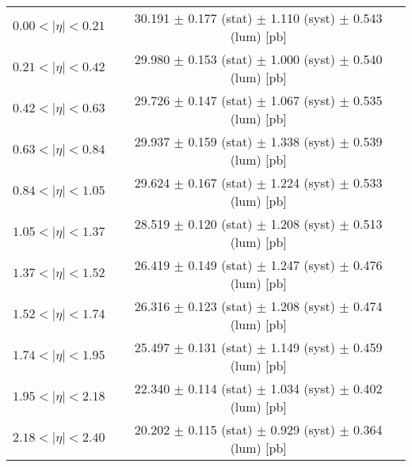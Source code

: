 \begin{tabular}{lc}
\hline
$0.00 < |\eta| <0.21$          & 30.191 $\pm$ 0.177 (stat) $\pm$ 1.110 (syst) $\pm$ 0.543 (lum) [pb]  \\
$0.21 < |\eta| <0.42$          & 29.980 $\pm$ 0.153 (stat) $\pm$ 1.000 (syst) $\pm$ 0.540 (lum) [pb]  \\
$0.42 < |\eta| <0.63$          & 29.726 $\pm$ 0.147 (stat) $\pm$ 1.067 (syst) $\pm$ 0.535 (lum) [pb]  \\
$0.63 < |\eta| <0.84$          & 29.937 $\pm$ 0.159 (stat) $\pm$ 1.338 (syst) $\pm$ 0.539 (lum) [pb]  \\
$0.84 < |\eta| <1.05$          & 29.624 $\pm$ 0.167 (stat) $\pm$ 1.224 (syst) $\pm$ 0.533 (lum) [pb]  \\
$1.05 < |\eta| <1.37$          & 28.519 $\pm$ 0.120 (stat) $\pm$ 1.208 (syst) $\pm$ 0.513 (lum) [pb]  \\
$1.37 < |\eta| <1.52$          & 26.419 $\pm$ 0.149 (stat) $\pm$ 1.247 (syst) $\pm$ 0.476 (lum) [pb]  \\
$1.52 < |\eta| <1.74$          & 26.316 $\pm$ 0.123 (stat) $\pm$ 1.208 (syst) $\pm$ 0.474 (lum) [pb]  \\
$1.74 < |\eta| <1.95$          & 25.497 $\pm$ 0.131 (stat) $\pm$ 1.149 (syst) $\pm$ 0.459 (lum) [pb]  \\
$1.95 < |\eta| <2.18$          & 22.340 $\pm$ 0.114 (stat) $\pm$ 1.034 (syst) $\pm$ 0.402 (lum) [pb]  \\
$2.18 < |\eta| <2.40$          & 20.202 $\pm$ 0.115 (stat) $\pm$ 0.929 (syst) $\pm$ 0.364 (lum) [pb]  \\
\hline
\end{tabular}
